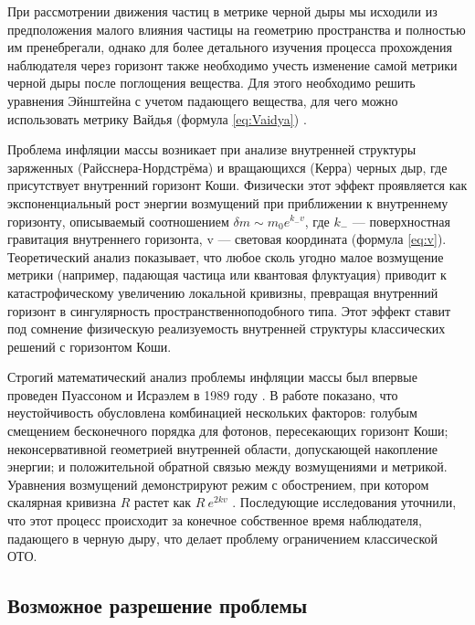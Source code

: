 При рассмотрении движения частиц в метрике черной дыры мы исходили из предположения малого влияния частицы на геометрию пространства и полностью им пренебрегали, однако для более детального изучения процесса прохождения наблюдателя через горизонт также необходимо учесть изменение самой метрики черной дыры после поглощения вещества. Для этого необходимо решить уравнения Эйнштейна с учетом падающего вещества, для чего можно использовать метрику Вайдья (формула \cref{eq:Vaidya}) \cite{vaidya1951nonstatic, vaidya1951gravitational}.

Проблема инфляции массы возникает при анализе внутренней структуры заряженных (Райсснера-Нордстрёма) и вращающихся (Керра) черных дыр, где присутствует внутренний горизонт Коши. Физически этот эффект проявляется как экспоненциальный рост энергии возмущений при приближении к внутреннему горизонту, описываемый соотношением \(\delta m \sim m_0 e^{k_-v}\), где \(k_-\) — поверхностная гравитация внутреннего горизонта, v — световая координата (формула \cref{eq:v}). Теоретический анализ показывает, что любое сколь угодно малое возмущение метрики (например, падающая частица или квантовая флуктуация) приводит к катастрофическому увеличению локальной кривизны, превращая внутренний горизонт в сингулярность пространственноподобного типа. Этот эффект ставит под сомнение физическую реализуемость внутренней структуры классических решений с горизонтом Коши.

Строгий математический анализ проблемы инфляции массы был впервые проведен Пуассоном и Исраэлем в 1989 году \cite{poissonInnerhorizonInstabilityMass1989, poissonEschatologyBlackHole1989}. В работе показано, что неустойчивость обусловлена комбинацией нескольких факторов: голубым смещением бесконечного порядка для фотонов, пересекающих горизонт Коши;  неконсервативной геометрией внутренней области, допускающей накопление энергии; и положительной обратной связью между возмущениями и метрикой. Уравнения возмущений демонстрируют режим с обострением, при котором скалярная кривизна \(R\) растет как \(R ~ e^{2kv}\) \cite{poissonInternalStructureBlack1990}. Последующие исследования уточнили, что этот процесс происходит за конечное собственное время наблюдателя, падающего в черную дыру, что делает проблему ограничением классической ОТО.

\subsection{Возможное разрешение проблемы}\label{sub:2.3.2}

